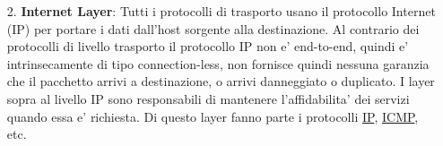 \begin{enumerate}

    \item[2.] \textbf{Internet Layer}: Tutti i protocolli di trasporto usano il protocollo Internet (IP) per portare i dati dall'host sorgente alla destinazione. Al contrario dei protocolli di livello trasporto il protocollo IP non e' end-to-end, quindi e' intrinsecamente di tipo connection-less, non fornisce quindi nessuna garanzia che il pacchetto arrivi a destinazione, o arrivi danneggiato o duplicato. I layer sopra al livello IP sono responsabili di mantenere l'affidabilita' dei servizi quando essa e' richiesta. \newline 
    Di questo layer fanno parte i protocolli \href{https://en.wikipedia.org/wiki/Internet_Protocol}{IP}, \href{https://en.wikipedia.org/wiki/Internet_Control_Message_Protocol}{ICMP}, etc.
    


\end{enumerate}
